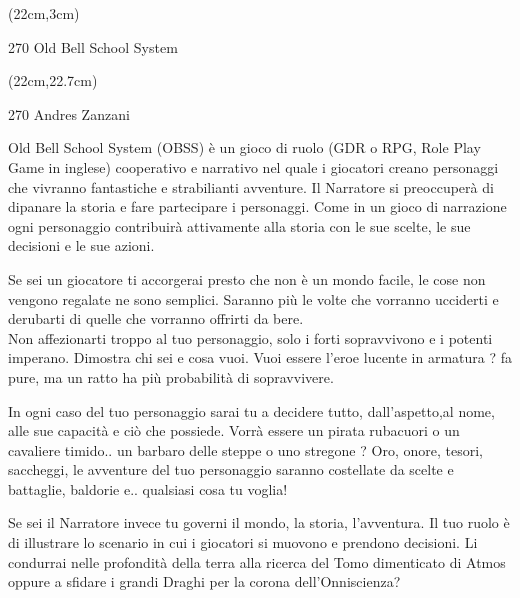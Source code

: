 \documentclass[10pt,a4paper]{article}
\begin{document}
\begin{textblock*}{2cm}(22cm,3cm) %
\begin{turn}{270}
	{\Huge Old Bell School System}\\
\end{turn}
\end{textblock*}


\begin{textblock*}{2cm}(22cm,22.7cm) %
\begin{turn}{270}
	{\Huge Andres Zanzani}
\end{turn}
\end{textblock*}



Old Bell School System (OBSS) è un gioco di ruolo (GDR o RPG, Role Play Game in inglese) cooperativo e narrativo nel quale i giocatori creano personaggi che vivranno fantastiche e strabilianti avventure. Il Narratore si preoccuperà di dipanare la storia e fare partecipare i personaggi. Come in un gioco di narrazione ogni personaggio contribuirà attivamente alla storia con le sue scelte, le sue decisioni e le sue azioni.

Se sei un giocatore ti accorgerai presto che non è un mondo facile, le cose non vengono regalate ne sono semplici. Saranno più le volte che vorranno ucciderti e derubarti di quelle che vorranno offrirti da bere.\\
Non affezionarti troppo al tuo personaggio, solo i forti sopravvivono e i potenti imperano. Dimostra chi sei e cosa vuoi. Vuoi essere l'eroe lucente in armatura ? fa pure, ma un ratto ha più probabilità di sopravvivere.

In ogni caso del tuo personaggio sarai tu a decidere tutto, dall'aspetto,al nome, alle sue capacità e ciò che possiede. Vorrà essere un pirata rubacuori o un cavaliere timido.. un barbaro delle steppe o uno stregone ? Oro, onore, tesori, saccheggi, le avventure del tuo personaggio saranno costellate da scelte e battaglie, baldorie e.. qualsiasi cosa tu voglia!

Se sei il Narratore invece tu governi il mondo,  la storia, l'avventura. Il tuo ruolo è di illustrare lo scenario in cui i giocatori si muovono e prendono decisioni. Li condurrai nelle profondità della terra alla ricerca del Tomo dimenticato di Atmos oppure a sfidare i grandi Draghi per la corona dell'Onniscienza?
\end{document}
